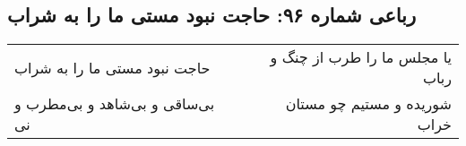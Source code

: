 \begin{center}
\section*{رباعی شماره ۹۶: حاجت نبود مستی ما را به شراب}
\label{sec:0096}
\begin{longtable}{l p{0.5cm} r}
حاجت نبود مستی ما را به شراب
&&
یا مجلس ما را طرب از چنگ و رباب
\\
بی‌ساقی و بی‌شاهد و بی‌مطرب و نی
&&
شوریده و مستیم چو مستان خراب
\\
\end{longtable}
\end{center}

